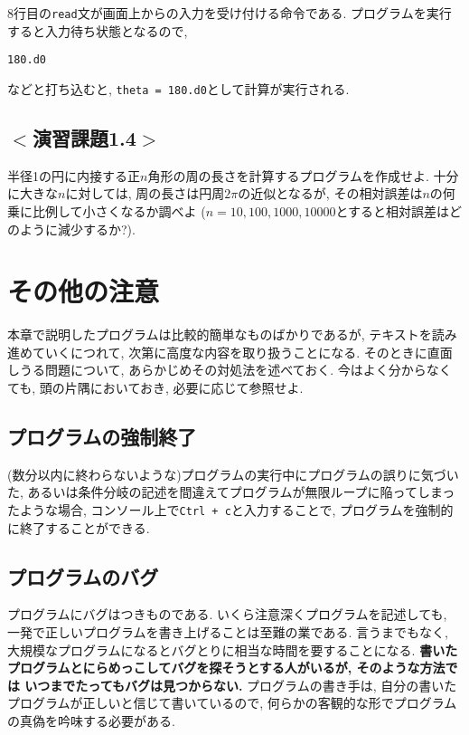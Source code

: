 8行目の\verb|read|文が画面上からの入力を受け付ける命令である.
プログラムを実行すると入力待ち状態となるので,
\begin{Verbatim}[frame=single]
180.d0
\end{Verbatim}
などと打ち込むと, \verb|theta = 180.d0|として計算が実行される.


\subsection*{$<$演習課題1.4$>$}
半径1の円に内接する正$n$角形の周の長さを計算するプログラムを作成せよ.
十分に大きな$n$に対しては, 周の長さは円周$2\pi$の近似となるが,
その相対誤差は$n$の何乗に比例して小さくなるか調べよ
($n=10, 100, 1000, 10000$とすると相対誤差はどのように減少するか?).


\section{その他の注意}
本章で説明したプログラムは比較的簡単なものばかりであるが,
テキストを読み進めていくにつれて, 次第に高度な内容を取り扱うことになる.
そのときに直面しうる問題について, あらかじめその対処法を述べておく.
今はよく分からなくても, 頭の片隅においておき, 必要に応じて参照せよ.

\subsection{プログラムの強制終了}
(数分以内に終わらないような)プログラムの実行中にプログラムの誤りに気づいた,
あるいは条件分岐の記述を間違えてプログラムが無限ループに陥ってしまったような場合,
コンソール上で\verb|Ctrl + c|と入力することで,
プログラムを強制的に終了することができる.

\subsection{プログラムのバグ}
プログラムにバグはつきものである.
いくら注意深くプログラムを記述しても, 一発で正しいプログラムを書き上げることは至難の業である.
言うまでもなく, 大規模なプログラムになるとバグとりに相当な時間を要することになる.
\textbf{書いたプログラムとにらめっこしてバグを探そうとする人がいるが, そのような方法では
いつまでたってもバグは見つからない.}
プログラムの書き手は, 自分の書いたプログラムが正しいと信じて書いているので,
何らかの客観的な形でプログラムの真偽を吟味する必要がある. \\

